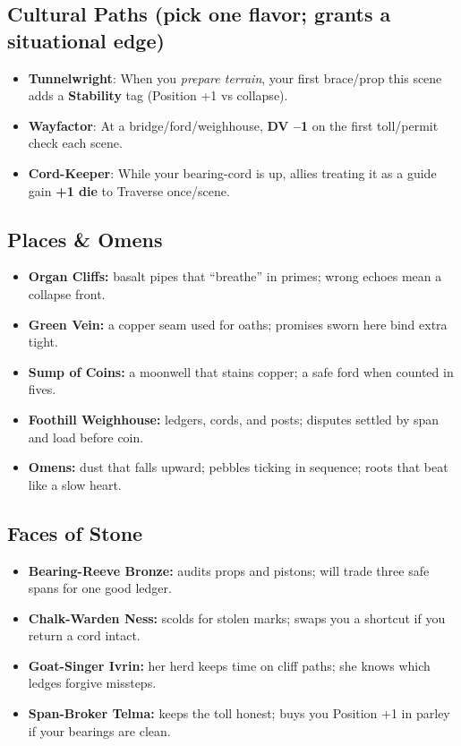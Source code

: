 \documentclass[11pt,letterpaper]{article}
\begin{document}
\subsection*{Cultural Paths (pick one flavor; grants a situational edge)}
\begin{itemize}
\item \textbf{Tunnelwright}: When you \emph{prepare terrain}, your first brace/prop this scene adds a \textbf{Stability} tag (Position +1 vs collapse).
\item \textbf{Wayfactor}: At a bridge/ford/weighhouse, \textbf{DV --1} on the first toll/permit check each scene.
\item \textbf{Cord-Keeper}: While your bearing-cord is up, allies treating it as a guide gain \textbf{+1 die} to Traverse once/scene.
\end{itemize}

\subsection*{Places \& Omens}
\begin{itemize}
\item \textbf{Organ Cliffs:} basalt pipes that ``breathe'' in primes; wrong echoes mean a collapse front.
\item \textbf{Green Vein:} a copper seam used for oaths; promises sworn here bind extra tight.
\item \textbf{Sump of Coins:} a moonwell that stains copper; a safe ford when counted in fives.
\item \textbf{Foothill Weighhouse:} ledgers, cords, and posts; disputes settled by span and load before coin.
\item \textbf{Omens:} dust that falls upward; pebbles ticking in sequence; roots that beat like a slow heart.
\end{itemize}

\subsection*{Faces of Stone}
\begin{itemize}
\item \textbf{Bearing-Reeve Bronze:} audits props and pistons; will trade three safe spans for one good ledger.
\item \textbf{Chalk-Warden Ness:} scolds for stolen marks; swaps you a shortcut if you return a cord intact.
\item \textbf{Goat-Singer Ivrin:} her herd keeps time on cliff paths; she knows which ledges forgive missteps.
\item \textbf{Span-Broker Telma:} keeps the toll honest; buys you Position +1 in parley if your bearings are clean.
\end{itemize}
\end{document}

